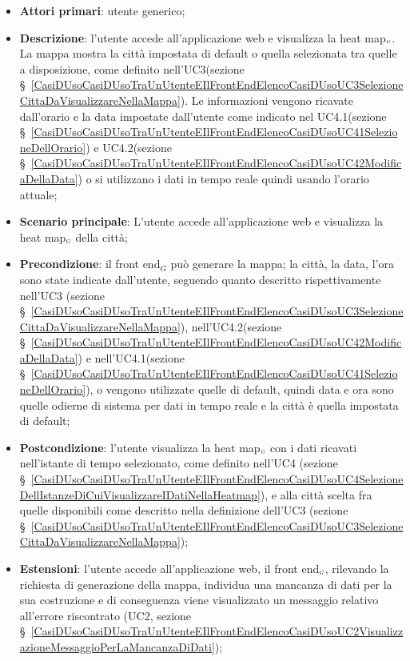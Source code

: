 \begin{itemize}
	\item \textbf{Attori primari}: utente generico;
	\item \textbf{Descrizione}: l’utente accede all’applicazione web e visualizza la heat map$_{\scaleto{G}{3pt}}$. La mappa mostra la città impostata di default o quella selezionata tra quelle a disposizione, come definito nell’UC3(sezione \S~\ref{CasiDUsoCasiDUsoTraUnUtenteEIlFrontEndElencoCasiDUsoUC3SelezioneCittaDaVisualizzareNellaMappa}). Le informazioni vengono ricavate dall’orario e la data impostate dall’utente come indicato nel UC4.1(sezione \S~\ref{CasiDUsoCasiDUsoTraUnUtenteEIlFrontEndElencoCasiDUsoUC41SelezioneDellOrario}) e UC4.2(sezione \S~\ref{CasiDUsoCasiDUsoTraUnUtenteEIlFrontEndElencoCasiDUsoUC42ModificaDellaData}) o si utilizzano i dati in tempo reale quindi usando l’orario attuale;
	\item \textbf{Scenario principale}: L’utente accede all’applicazione web e visualizza la heat map$_{\scaleto{G}{3pt}}$ della città;
	\item \textbf{Precondizione}: il front end$_G$ può generare la mappa; la città, la data, l’ora sono state indicate dall’utente, seguendo quanto descritto rispettivamente nell'UC3 (sezione \S~\ref{CasiDUsoCasiDUsoTraUnUtenteEIlFrontEndElencoCasiDUsoUC3SelezioneCittaDaVisualizzareNellaMappa}), nell'UC4.2(sezione \S~\ref{CasiDUsoCasiDUsoTraUnUtenteEIlFrontEndElencoCasiDUsoUC42ModificaDellaData}) e nell'UC4.1(sezione \S~\ref{CasiDUsoCasiDUsoTraUnUtenteEIlFrontEndElencoCasiDUsoUC41SelezioneDellOrario}), o vengono utilizzate quelle di default, quindi data e ora sono quelle odierne di sistema per dati in tempo reale e la città è quella impostata di default;
	\item \textbf{Postcondizione}: l’utente visualizza la heat map$_{\scaleto{G}{3pt}}$ con i dati ricavati nell’istante di tempo selezionato, come definito nell’UC4 (sezione \S~\ref{CasiDUsoCasiDUsoTraUnUtenteEIlFrontEndElencoCasiDUsoUC4SelezioneDellIstanzeDiCuiVisualizzareIDatiNellaHeatmap}), e alla città scelta fra quelle disponibili come descritto nella definizione dell’UC3 (sezione \S~\ref{CasiDUsoCasiDUsoTraUnUtenteEIlFrontEndElencoCasiDUsoUC3SelezioneCittaDaVisualizzareNellaMappa});
	\item \textbf{Estensioni}: l’utente accede all’applicazione web, il front end$_{\scaleto{G}{3pt}}$, rilevando la richiesta di generazione della mappa, individua una mancanza di dati per la sua costruzione e di conseguenza viene visualizzato un messaggio relativo all’errore riscontrato (UC2, sezione \S~\ref{CasiDUsoCasiDUsoTraUnUtenteEIlFrontEndElencoCasiDUsoUC2VisualizzazioneMessaggioPerLaMancanzaDiDati});
\end{itemize}

